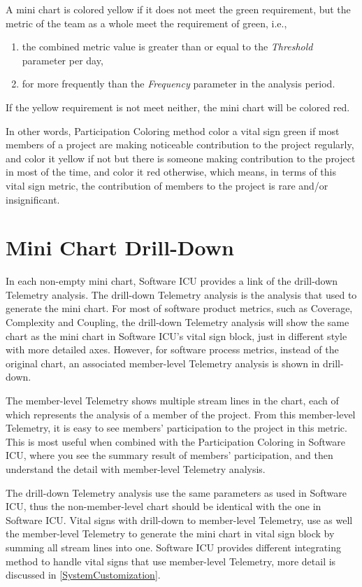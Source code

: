 A mini chart is colored yellow if it does not meet the green requirement, but the metric of the team as a whole meet the requirement of green, i.e., 
\begin{enumerate}
\item the combined metric value is greater than or equal to the {\it Threshold} parameter per day,
\item for more frequently than the {\it Frequency} parameter in the analysis period.
\end{enumerate}

If the yellow requirement is not meet neither, the mini chart will be colored red.

In other words, Participation Coloring method color a vital sign green if most members of a project are making noticeable contribution to the project regularly, and color it yellow if not but there is someone making contribution to the project in most of the time, and color it red otherwise, which means, in terms of this vital sign metric, the contribution of members to the project is rare and/or insignificant.

\section{Mini Chart Drill-Down}
In each non-empty mini chart, Software ICU provides a link of the drill-down Telemetry analysis. The drill-down Telemetry analysis is the analysis that used to generate the mini chart. For most of software product metrics, such as Coverage, Complexity and Coupling, the drill-down Telemetry analysis will show the same chart as the mini chart in Software ICU's vital sign block, just in different style with more detailed axes. However, for software process metrics, instead of the original chart, an associated member-level Telemetry analysis is shown in drill-down. 

The member-level Telemetry shows multiple stream lines in the chart, each of which represents the analysis of a member of the project. From this member-level Telemetry, it is easy to see members' participation to the project in this metric. This is most useful when combined with the Participation Coloring in Software ICU, where you see the summary result of members' participation, and then understand the detail with member-level Telemetry analysis.

The drill-down Telemetry analysis use the same parameters as used in Software ICU, thus the non-member-level chart should be identical with the one in Software ICU. Vital signs with drill-down to member-level Telemetry, use as well the member-level Telemetry to generate the mini chart in vital sign block by summing all stream lines into one. Software ICU provides different integrating method to handle vital signs that use member-level Telemetry, more detail is discussed in \autoref{SystemCustomization}.

